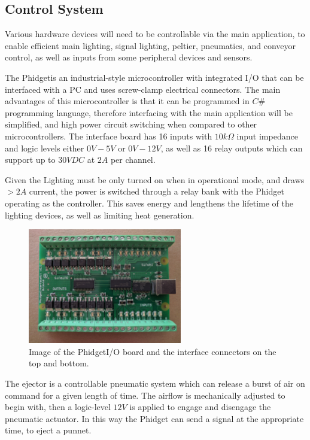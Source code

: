 \documentclass[fleqn,twoside,12pt]{report}
\begin{document}
\subsection{Control System}
\label{sec:phidget}

Various hardware devices will need to be controllable via the main application, to enable efficient main lighting, signal lighting, peltier, pneumatics, and conveyor control, as well as inputs from some peripheral devices and sensors.


The Phidget\texttrademark is an industrial-style microcontroller with integrated I/O that can be interfaced with a PC and uses screw-clamp electrical connectors. The main advantages of this microcontroller is that it can be programmed in $C\#$ programming language, therefore interfacing with the main application will be simplified, and high power circuit switching when compared to other microcontrollers. The interface board has 16 inputs with $10k\Omega$ input impedance and logic levels either $0V-5V$ or $0V-12V$, as well as 16 relay outputs which can support up to $30VDC$ at $2A$ per channel. 


Given the Lighting must be only turned on when in operational mode, and draws $>2A$ current, the power is switched through a relay bank with the Phidget operating as the controller. This saves energy and lengthens the lifetime of the lighting devices, as well as limiting heat generation.


\begin{figure}
	\begin{center}
		\includegraphics[width=0.6\textwidth]{phidget.jpg}
	\end{center}
	\caption{Image of the Phidget\texttrademark I/O board and the interface connectors on the top and bottom.}
	\label{fig:phidget}
\end{figure} 


The ejector is a controllable pneumatic system which can release a burst of air on command for a given length of time. The airflow is mechanically adjusted to begin with, then a logic-level $12V$ is applied to engage and disengage the pneumatic actuator. In this way the Phidget can send a signal at the appropriate time, to eject a punnet.
\end{document}
